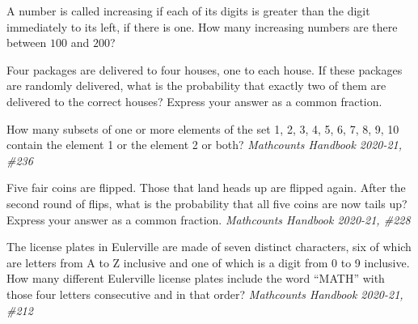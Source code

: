 \documentclass[9pt]{beamer}
\begin{document}
\begin{frame}[t]{6.6}
\begin{block}{}
    A number is called increasing if each of its digits is greater than the digit immediately to its left, if there is one. How many increasing numbers are there between $100$ and $200$?
\end{block}
\end{frame}

\begin{frame}[t]{6.7}
\begin{block}{}
    Four packages are delivered to four houses, one to each house. If these packages are randomly delivered, what is the probability that exactly two of them are delivered to the correct houses? Express your answer as a common fraction.
\end{block}
\end{frame}

\begin{frame}[t]{6.8}
\begin{block}{}
     How many subsets of one or more elements of the set {1, 2, 3, 4, 5, 6, 7, 8, 9, 10} contain the element 1 or the element 2 or both? \textit{Mathcounts Handbook 2020-21, \#236}
\end{block}
\end{frame}



\begin{frame}[t]{6.9}
\begin{block}{}
     Five fair coins are flipped. Those that land heads up are flipped again. After the second round of flips, what is the probability that all five coins are now tails up? Express your answer as a common fraction. \textit{Mathcounts Handbook 2020-21, \#228}
\end{block}
\end{frame}

\begin{frame}[t]{6.10}
\begin{block}{}
     The license plates in Eulerville are made of seven distinct characters, six of which are letters from A to Z inclusive and one of which is a digit from 0 to 9 inclusive. How many different Eulerville license plates include the word ``MATH'' with those four letters consecutive and in that order? \textit{Mathcounts Handbook 2020-21, \#212}
\end{block}
\end{frame}
\newpage
\end{document}
